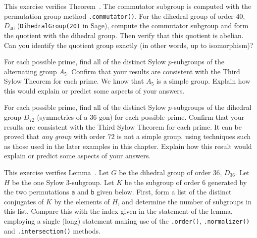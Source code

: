 \begin{sageverbatim}\end{sageverbatim}
%
%
This exercise verifies Theorem~.  The commutator subgroup is computed with the permutation group method \verb?.commutator()?.  For the dihedral group of order 40, $D_{40}$ (\verb?DihedralGroup(20)? in Sage), compute the commutator subgroup and form the quotient with the dihedral group.  Then verify that this quotient is abelian.  Can you identify the quotient group exactly (in other words, up to isomorphism)?
\begin{sageverbatim}\end{sageverbatim}
%
%
For each possible prime, find all of the distinct Sylow $p$-subgroups of the alternating group $A_5$.  Confirm that your results are consistent with the Third Sylow Theorem for each prime.  We know that $A_5$ is a simple group.  Explain how this would explain or predict some aspects of your answers.
\begin{sageverbatim}\end{sageverbatim}
%
%
For each possible prime, find all of the distinct Sylow $p$-subgroups of the dihedral group $D_{72}$ (symmetries of a $36$-gon) for each possible prime.  Confirm that your results are consistent with the Third Sylow Theorem for each prime.  It can be proved that {\em any group} with order $72$ is not a simple group, using techniques such as those used in the later examples in this chapter.  Explain how this result would explain or predict some aspects of your answers.\begin{sageverbatim}\end{sageverbatim}
%
%
This exercise verifies Lemma~.  Let $G$ be the dihedral group of order $36$, $D_{36}$.  Let $H$ be the one Sylow $3$-subgroup.  Let $K$ be the subgroup of order $6$ generated by the two permutations \verb?a? and \verb?b? given below.  First, form a list of the distinct conjugates of $K$ by the elements of $H$, and determine the number of subgroups in this list.  Compare this with the index given in the statement of the lemma, employing a single (long) statement making use of the \verb?.order()?, \verb?.normalizer()? and \verb?.intersection()? methods.\par
